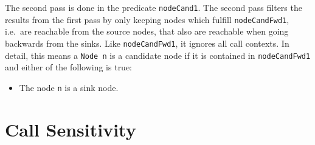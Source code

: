 The second pass is done in the predicate \texttt{nodeCand1}.
The second pass filters the results from the first pass by only keeping nodes
which fulfill \texttt{nodeCandFwd1}, i.e.\ are reachable from the source nodes,
that also are reachable when going backwards from the sinks.
Like \texttt{nodeCandFwd1}, it ignores all call contexts.
In detail, this means a \texttt{Node n} is a candidate node if it is contained in 
\texttt{nodeCandFwd1} and either of the following is true:
\begin{itemize}
    \item The node \texttt{n} is a sink node.
\end{itemize}














\newpage
\section{Call Sensitivity}
